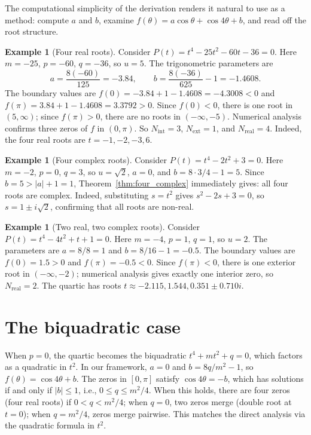\documentclass[12pt]{article}
\theoremstyle{definition}
\newtheorem{example}[theorem]{Example}
\theoremstyle{remark}
\begin{document}
The computational simplicity of the derivation renders it natural to use as a method: compute $a$ and $b$, examine $f(\theta) = a\cos\theta + \cos 4\theta + b$, and read off the root structure.

\begin{example}[Four real roots]\label{ex:four_real}
Consider $P(t) = t^4 - 25t^2 - 60t - 36 = 0$. Here $m = -25$, $p = -60$, $q = -36$, so $u = 5$. The trigonometric parameters are
\[
a = \frac{8(-60)}{125} = -3.84, \qquad b = \frac{8(-36)}{625} - 1 = -1.4608.
\]
The boundary values are $f(0) = -3.84 + 1 - 1.4608 = -4.3008 < 0$ and $f(\pi) = 3.84 + 1 - 1.4608 = 3.3792 > 0$. Since $f(0) < 0$, there is one root in $(5, \infty)$; since $f(\pi) > 0$, there are no roots in $(-\infty, -5)$. Numerical analysis confirms three zeros of $f$ in $(0,\pi)$. So $N_{\mathrm{int}} = 3$, $N_{\mathrm{ext}} = 1$, and $N_{\mathrm{real}} = 4$. Indeed, the four real roots are $t = -1, -2, -3, 6$.
\end{example}

\begin{example}[Four complex roots]\label{ex:four_complex}
Consider $P(t) = t^4 - 2t^2 + 3 = 0$. Here $m = -2$, $p = 0$, $q = 3$, so $u = \sqrt{2}$, $a = 0$, and $b = 8 \cdot 3/4 - 1 = 5$. Since $b = 5 > |a| + 1 = 1$, Theorem~\ref{thm:four_complex} immediately gives: all four roots are complex. Indeed, substituting $s = t^2$ gives $s^2 - 2s + 3 = 0$, so $s = 1 \pm i\sqrt{2}$, confirming that all roots are non-real.
\end{example}

\begin{example}[Two real, two complex roots]\label{ex:two_real}
Consider $P(t) = t^4 - 4t^2 + t + 1 = 0$. Here $m = -4$, $p = 1$, $q = 1$, so $u = 2$. The parameters are $a = 8/8 = 1$ and $b = 8/16 - 1 = -0.5$. The boundary values are $f(0) = 1.5 > 0$ and $f(\pi) = -0.5 < 0$. Since $f(\pi) < 0$, there is one exterior root in $(-\infty, -2)$; numerical analysis gives exactly one interior zero, so $N_{\mathrm{real}} = 2$. The quartic has roots $t \approx -2.115, 1.544, 0.351 \pm 0.710i$.
\end{example}

\section{The biquadratic case}

When $p = 0$, the quartic becomes the biquadratic $t^4 + mt^2 + q = 0$, which factors as a quadratic in $t^2$. In our framework, $a = 0$ and $b = 8q/m^2 - 1$, so $f(\theta) = \cos 4\theta + b$. The zeros in $[0,\pi]$ satisfy $\cos 4\theta = -b$, which has solutions if and only if $|b| \leq 1$, i.e., $0 \leq q \leq m^2/4$. When this holds, there are four zeros (four real roots) if $0 < q < m^2/4$; when $q = 0$, two zeros merge (double root at $t = 0$); when $q = m^2/4$, zeros merge pairwise. This matches the direct analysis via the quadratic formula in $t^2$.
\end{document}
